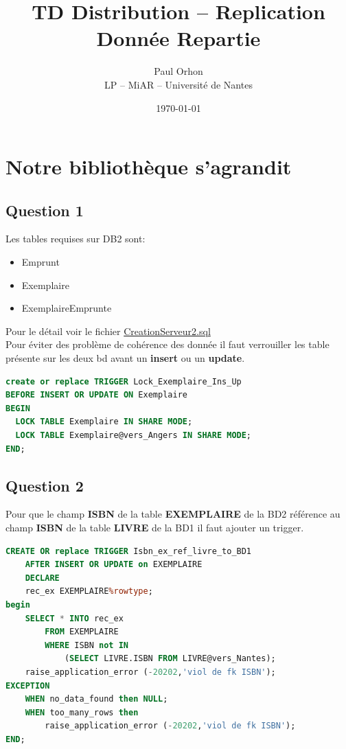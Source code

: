 \documentclass{article}
\title{\huge{TD Distribution – Replication}\\
\normalsize Donnée Repartie}
\date{\today}
\author{Paul Orhon \\
\small LP -- MiAR -- Université de Nantes }
\begin{document}
\maketitle
\tableofcontents
\lstlistoflistings

\clearpage

\section{Notre bibliothèque s'agrandit}
\subsection{Question 1}
Les tables requises sur DB2 sont:
\begin{itemize}
    \item Emprunt
    \item Exemplaire
    \item ExemplaireEmprunte
\end{itemize}
Pour le détail voir le fichier \href{https://github.com/paul604/donnees-reparties/blob/master/DISTRIBUTION-REPLICATION/CreationServeur2.sql}{CreationServeur2.sql}
\\

Pour éviter des problème de cohérence des donnée il faut verrouiller les table présente sur les deux bd avant un \textbf{insert} ou un \textbf{update}.
\begin{lstlisting}[language=SQL, caption= Trigger: lock Exemplaire]
create or replace TRIGGER Lock_Exemplaire_Ins_Up
BEFORE INSERT OR UPDATE ON Exemplaire 
BEGIN
  LOCK TABLE Exemplaire IN SHARE MODE;
  LOCK TABLE Exemplaire@vers_Angers IN SHARE MODE;
END;
\end{lstlisting}

\subsection{Question 2}
Pour que le champ \textbf{ISBN} de la table \textbf{EXEMPLAIRE} de la BD2 référence au champ \textbf{ISBN} de la table \textbf{LIVRE} de la BD1 il faut ajouter un trigger.

\label{lst:1}
\begin{lstlisting}[language=SQL, caption= Trigger: ISBN exemplaire ref livre]
CREATE OR replace TRIGGER Isbn_ex_ref_livre_to_BD1
    AFTER INSERT OR UPDATE on EXEMPLAIRE
    DECLARE
    rec_ex EXEMPLAIRE%rowtype;
begin
    SELECT * INTO rec_ex
        FROM EXEMPLAIRE 
        WHERE ISBN not IN
            (SELECT LIVRE.ISBN FROM LIVRE@vers_Nantes);
    raise_application_error (-20202,'viol de fk ISBN'); 
EXCEPTION
    WHEN no_data_found then NULL;
    WHEN too_many_rows then
        raise_application_error (-20202,'viol de fk ISBN');
END;
\end{lstlisting}
\end{document}
